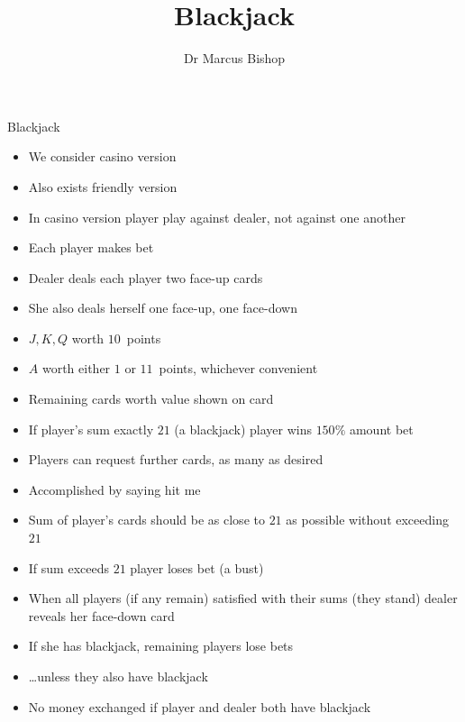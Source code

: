 \documentclass{beamer}
\title[Blackjack]{Blackjack}
\author{Dr Marcus Bishop}
\theoremstyle{definition}
\begin{document}
\begin{frame}\titlepage\end{frame}
\LogoOff

\begin{frame}{Blackjack}
\begin{itemize}
\item We consider casino version
\item Also exists friendly version
\item In casino version player play against dealer, not against one another
\item Each player makes bet
\item Dealer deals each player two face-up cards
\item She also deals herself one face-up, one face-down
\item $J,K,Q$ worth $10$~points
\item $A$ worth either $1$ or $11$~points, whichever convenient
\item Remaining cards worth value shown on card
\end{itemize}
\end{frame}

\begin{frame}
\begin{itemize}
\item If player's sum exactly $21$ (a \alert{blackjack}) player wins
$150\%$ amount bet
\item Players can request further cards, as many as desired
\item Accomplished by saying \alert{hit me}
\item Sum of player's cards should be as close to $21$ as possible
without exceeding $21$
\item If sum exceeds $21$ player loses bet (a \alert{bust})
\item When all players (if any remain)
satisfied with their sums
(they \alert{stand}) dealer reveals her
face-down card
\item If she has blackjack, remaining players lose bets
\item \dots unless they also have blackjack
\item No money exchanged if player and dealer both have blackjack
\end{itemize}
\end{frame}
\end{document}
